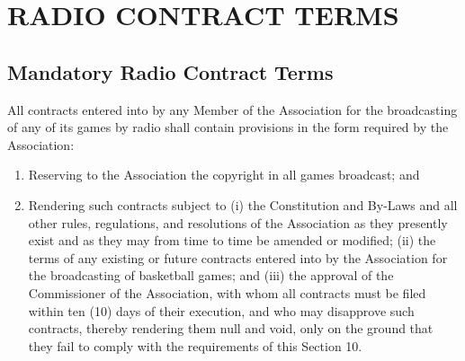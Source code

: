 \documentclass[]{book}
\providecommand{\tightlist}{%
  \setlength{\itemsep}{0pt}\setlength{\parskip}{0pt}}
\begin{document}
\hypertarget{radio-contract-terms}{%
\section{RADIO CONTRACT TERMS}\label{radio-contract-terms}}

\hypertarget{mandatory-radio-contract-terms}{%
\subsection{Mandatory Radio Contract Terms}\label{mandatory-radio-contract-terms}}

All contracts entered into by any Member of the Association for the broadcasting of any of its games by radio shall contain provisions in the form required by the Association:

\begin{enumerate}
\def\labelenumi{(\alph{enumi})}
\tightlist
\item
  Reserving to the Association the copyright in all games broadcast; and
\item
  Rendering such contracts subject to (i) the Constitution and By-Laws and all other rules, regulations, and resolutions of the Association as they presently exist and as they may from time to time be amended or modified; (ii) the terms of any existing or future contracts entered into by the Association for the broadcasting of basketball games; and (iii) the approval of the Commissioner of the Association, with whom all contracts must be filed within ten (10) days of their execution, and who may disapprove such contracts, thereby rendering them null and void, only on the ground that they fail to comply with the requirements of this Section 10.
\end{enumerate}
\end{document}
